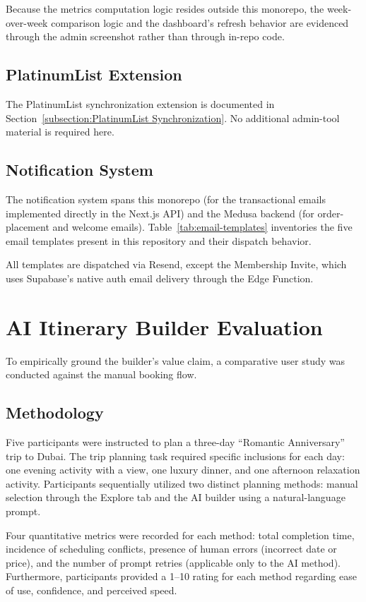 Because the metrics computation logic resides outside this monorepo, the week-over-week comparison logic and the dashboard's refresh behavior are evidenced through the admin screenshot rather than through in-repo code.

\subsection{PlatinumList Extension}
The PlatinumList synchronization extension is documented in Section~\ref{subsection:PlatinumList Synchronization}. No additional admin-tool material is required here.

\subsection{Notification System}
The notification system spans this monorepo (for the transactional emails implemented directly in the Next.js API) and the Medusa backend (for order-placement and welcome emails). Table~\ref{tab:email-templates}
inventories the five email templates present in this repository and their dispatch behavior.



All templates are dispatched via Resend, except the Membership Invite, which uses Supabase's native auth email delivery through the Edge Function.

\section{AI Itinerary Builder Evaluation}
To empirically ground the builder's value claim, a comparative user study was conducted against the manual booking flow.

\subsection{Methodology}
\label{subsection:Methodology}
Five participants were instructed to plan a three-day ``Romantic Anniversary'' trip to Dubai. The trip planning task required specific inclusions for each day: one evening activity with a view, one luxury dinner, and one afternoon relaxation activity. Participants sequentially utilized two distinct planning methods: manual selection through the Explore tab and the AI builder using a natural-language prompt.

Four quantitative metrics were recorded for each method: total completion time, incidence of scheduling conflicts, presence of human errors (incorrect date or price), and the number of prompt retries (applicable only to the AI method). Furthermore, participants provided a 1–10 rating for each method regarding ease of use, confidence, and perceived speed.


